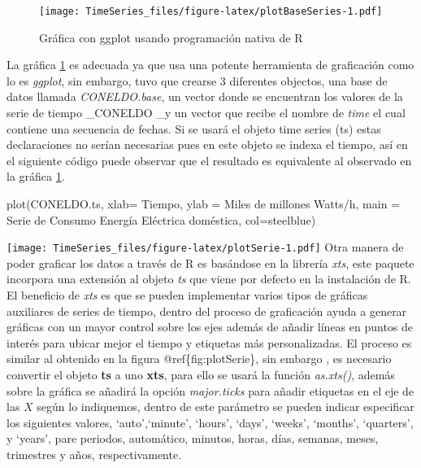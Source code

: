 \documentclass[
  spanish,
]{book}
\newenvironment{Shaded}{\begin{snugshade}}{\end{snugshade}}
\newcommand{\AttributeTok}[1]{\textcolor[rgb]{0.77,0.63,0.00}{#1}}
\newcommand{\FunctionTok}[1]{\textcolor[rgb]{0.00,0.00,0.00}{#1}}
\newcommand{\NormalTok}[1]{#1}
\newcommand{\StringTok}[1]{\textcolor[rgb]{0.31,0.60,0.02}{#1}}
\theoremstyle{remark}
\begin{document}
\begin{figure}
\centering
\texttt{[image: TimeSeries\_files/figure-latex/plotBaseSeries-1.pdf]}
\caption{\label{fig:plotBaseSeries}Gráfica con ggplot usando programación nativa de R}
\end{figure}

La gráfica \ref{fig:plotBaseSeries} es adecuada ya que usa una potente herramienta de graficación como lo es \emph{ggplot}, sin embargo, tuvo que crearse 3 diferentes objectos, una base de datos llamada \emph{CONELDO.base}, un vector donde se encuentran los valores de la serie de tiempo \_CONELDO \_y un vector que recibe el nombre de \emph{time} el cual contiene una secuencia de fechas. Si se usará el objeto time series (ts) estas declaraciones no serían necesarias pues en este objeto se indexa el tiempo, así en el siguiente código puede observar que el resultado es equivalente al observado en la gráfica \ref{fig:plotBaseSeries}.

\begin{Shaded}
\begin{Highlighting}[]
\FunctionTok{plot}\NormalTok{(CONELDO.ts,  }\AttributeTok{xlab=} \StringTok{\textquotesingle{}Tiempo\textquotesingle{}}\NormalTok{, }\AttributeTok{ylab =} \StringTok{\textquotesingle{}Miles de millones Watts/h\textquotesingle{}}\NormalTok{,}
     \AttributeTok{main =} \StringTok{\textquotesingle{}Serie de Consumo Energía Eléctrica doméstica\textquotesingle{}}\NormalTok{,}
     \AttributeTok{col=}\StringTok{\textquotesingle{}steelblue\textquotesingle{}}\NormalTok{)}
\end{Highlighting}
\end{Shaded}

\texttt{[image: TimeSeries\_files/figure-latex/plotSerie-1.pdf]}
Otra manera de poder graficar los datos a través de R es basándose en la librería \emph{xts}, este paquete incorpora una extensión al objeto \emph{ts} que viene por defecto en la instalación de R. El beneficio de \emph{xts} es que se pueden implementar varios tipos de gráficas auxiliares de series de tiempo, dentro del proceso de graficación ayuda a generar gráficas con un mayor control sobre los ejes además de añadir líneas en puntos de interés para ubicar mejor el tiempo y etiquetas más personalizadas. El proceso es similar al obtenido en la figura @ref\{fig:plotSerie\}, sin embargo , es necesario convertir el objeto \textbf{ts} a uno \textbf{xts}, para ello se usará la función \emph{as.xts()}, además sobre la gráfica se añadirá la opción \emph{major.ticks} para añadir etiquetas en el eje de las \(X\) según lo indiquemos, dentro de este parámetro se pueden indicar especificar los siguientes valores, `auto',`minute', `hours', `days', `weeks', `months', `quarters', y `years', pare periodos, automático, minutos, horas, días, semanas, meses, trimestres y años, respectivamente.
\end{document}
